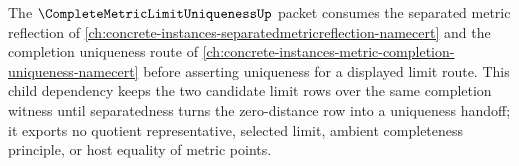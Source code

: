The $\CompleteMetricLimitUniquenessUp$ packet consumes the separated metric reflection of \autoref{ch:concrete-instances-separatedmetricreflection-namecert} and the completion uniqueness route of \autoref{ch:concrete-instances-metric-completion-uniqueness-namecert} before asserting uniqueness for a displayed limit route. This child dependency keeps the two candidate limit rows over the same completion witness until separatedness turns the zero-distance row into a uniqueness handoff; it exports no quotient representative, selected limit, ambient completeness principle, or host equality of metric points.
